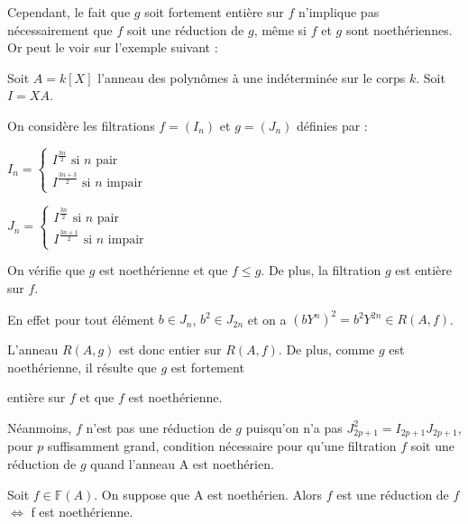 \begin{maremarque}
	Cependant, le fait que $g$ soit fortement entière sur $f$ n'implique pas
	nécessairement que $f$ soit une réduction de $g$, m\^{e}me si $f$ et 
	$g$ sont noethériennes. Or peut le voir sur l'exemple suivant : 
	
	Soit $A=k[X]$ l'anneau des polynômes à une indéterminée sur le
	corps $k$. Soit $I=XA$. 
	
	On considère les filtrations $f=(I_{n})$ et $g=(J_{n})$ définies par
	:
	
	$I_{n}=\left\{ 
	\begin{array}{c}
		I^{\frac{3n}{2}}\text{ si }n\text{ pair} \\ 
		I^{\frac{3n+3}{2}}\text{ si }n\text{ impair}%
	\end{array}%
	\right. $
	
	$J_{n}=\left\{ 
	\begin{array}{c}
		I^{\frac{3n}{2}}\text{ si }n\text{ pair} \\ 
		I^{\frac{3n+1}{2}}\text{ si }n\text{ impair}
	\end{array}
	\right. $
	
	On vérifie que $g$ est noethérienne et que $f\leq g$. De plus, la
	filtration $g$ est entière sur $f$. 
	
	En effet pour tout élément $b\in J_{n}$, $b^{2}\in J_{2n}$ et on a $%
	(bY^{n})^{2}=b^{2}Y^{2n}\in R(A,f)$. 
	
	L'anneau $R(A,g)$ est donc entier sur $R(A,f)$. De plus, comme $g$ est noethérienne, il résulte que $g$ est fortement
	
	entière sur $f$ et que $f$ est noethérienne. 
	
	Néanmoins, $f$ n'est pas une réduction de $g$ puisqu'on n'a pas $J_{2p+1}^{2}=I_{2p+1}J_{2p+1}$, pour $p$ suffisamment grand, condition nécessaire pour qu'une filtration $f$ soit une réduction de $g$ quand
	l'anneau A est noethérien. 
\end{maremarque}
\begin{maremarque}
	Soit $f \in \mathbb{F}(A)$. On suppose que A est noethérien. Alors $f$ est une réduction de $f$ $\Longleftrightarrow$ f est noethérienne.
\end{maremarque}
